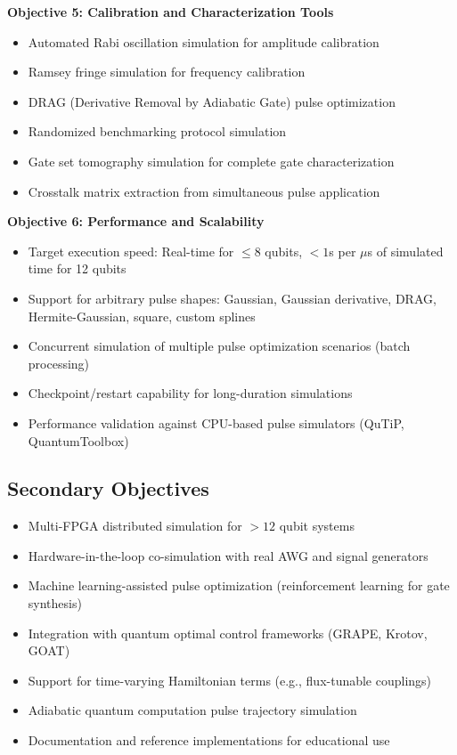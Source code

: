 \documentclass[12pt,a4paper]{article}
\begin{document}
\textbf{Objective 5: Calibration and Characterization Tools}

\begin{itemize}[noitemsep]
\item Automated Rabi oscillation simulation for amplitude calibration
\item Ramsey fringe simulation for frequency calibration
\item DRAG (Derivative Removal by Adiabatic Gate) pulse optimization
\item Randomized benchmarking protocol simulation
\item Gate set tomography simulation for complete gate characterization
\item Crosstalk matrix extraction from simultaneous pulse application
\end{itemize}

\textbf{Objective 6: Performance and Scalability}

\begin{itemize}[noitemsep]
\item Target execution speed: Real-time for $\leq 8$ qubits, $<1$s per $\mu$s of simulated time for 12 qubits
\item Support for arbitrary pulse shapes: Gaussian, Gaussian derivative, DRAG, Hermite-Gaussian, square, custom splines
\item Concurrent simulation of multiple pulse optimization scenarios (batch processing)
\item Checkpoint/restart capability for long-duration simulations
\item Performance validation against CPU-based pulse simulators (QuTiP, QuantumToolbox)
\end{itemize}

\subsection{Secondary Objectives}

\begin{itemize}[noitemsep]
\item Multi-FPGA distributed simulation for $>12$ qubit systems
\item Hardware-in-the-loop co-simulation with real AWG and signal generators
\item Machine learning-assisted pulse optimization (reinforcement learning for gate synthesis)
\item Integration with quantum optimal control frameworks (GRAPE, Krotov, GOAT)
\item Support for time-varying Hamiltonian terms (e.g., flux-tunable couplings)
\item Adiabatic quantum computation pulse trajectory simulation
\item Documentation and reference implementations for educational use
\end{itemize}
\end{document}
